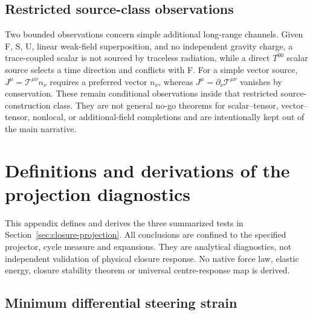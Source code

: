 \documentclass[11pt]{article}
\theoremstyle{plain}
\theoremstyle{remark}
\begin{document}
\subsection*{Restricted source-class observations}
Two bounded observations concern simple additional long-range channels.  Given F, S, U, linear weak-field superposition, and no independent gravity
charge, a trace-coupled scalar is not sourced by traceless radiation, while a direct
$T^{00}$ scalar source selects a time direction and conflicts with F.  For a simple
vector source, $J^\mu=\mathcal T^{\mu\nu}n_\nu$ requires a preferred vector $n_\nu$,
whereas $J^\mu=\partial_\nu\mathcal T^{\mu\nu}$ vanishes by conservation.  These remain
conditional observations inside that restricted source-construction class.  They are not
general no-go theorems for scalar--tensor, vector--tensor, nonlocal, or additional-field
completions and are intentionally kept out of the main narrative.

\section{Definitions and derivations of the projection diagnostics}
\label{app:projection-diagnostics}

This appendix defines and derives the three summarized tests in
Section~\ref{sec:closure-projection}.  All conclusions are confined to the
specified projector, cycle measure and expansions.  They are analytical
diagnostics, not independent validation of physical closure response.
No native force law, elastic energy, closure stability theorem or universal
centre-response map is derived.

\subsection{Minimum differential steering strain}
\label{app:projection-strain}
\end{document}
